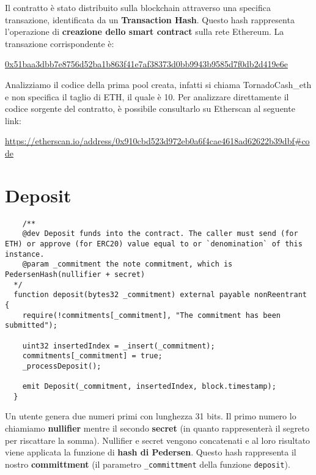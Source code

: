 \vspace{0.5em}
Il contratto è stato distribuito sulla blockchain attraverso una specifica transazione, identificata da un \textbf{Transaction Hash}. Questo hash rappresenta l'operazione di \textbf{creazione dello smart contract} sulla rete Ethereum. La transazione corrispondente è:

\vspace{0.5em}
\noindent
\href{https://etherscan.io/tx/0x51baa3dbb7e8756d52ba1b863f41e7af38373d0bb9943b9585d7f0db2d419e6e}{0x51baa3dbb7e8756d52ba1b863f41e7af38373d0bb9943b9585d7f0db2d419e6e}

\vspace{1em}
Analizziamo il codice della prima pool creata, infatti si chiama TornadoCash\_eth e non specifica il taglio di ETH, il quale è 10.
Per analizzare direttamente il codice sorgente del contratto, è possibile consultarlo su Etherscan al seguente link:  

\noindent
\url{https://etherscan.io/address/0x910cbd523d972eb0a6f4cae4618ad62622b39dbf#code} \cite{etherscan}

\section{Deposit}

\begin{lstlisting}
    /**
    @dev Deposit funds into the contract. The caller must send (for ETH) or approve (for ERC20) value equal to or `denomination` of this instance.
    @param _commitment the note commitment, which is PedersenHash(nullifier + secret)
  */
  function deposit(bytes32 _commitment) external payable nonReentrant {
    require(!commitments[_commitment], "The commitment has been submitted");

    uint32 insertedIndex = _insert(_commitment);
    commitments[_commitment] = true;
    _processDeposit();

    emit Deposit(_commitment, insertedIndex, block.timestamp);
  }
\end{lstlisting}

Un utente genera due numeri primi con lunghezza 31 bits. Il primo numero lo chiamiamo \textbf{nullifier} mentre il secondo \textbf{secret} (in quanto rappresenterà il segreto per riscattare la somma). Nullifier e secret vengono concatenati e al loro risultato viene applicata la funzione di \textbf{hash di Pedersen}. Questo hash rappresenta il nostro \textbf{committment} (il parametro \verb|_committment| della funzione \verb|deposit|).

